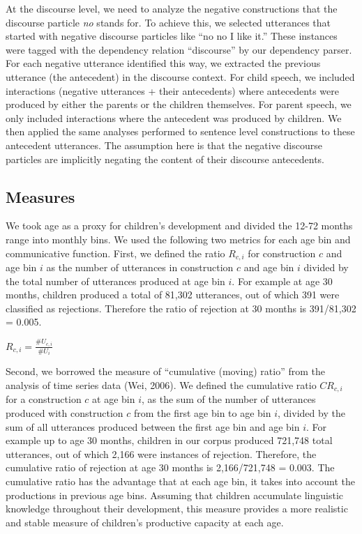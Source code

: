 \documentclass[
  english,
  man,floatsintext]{apa6}
\begin{document}
At the discourse level, we need to analyze the negative constructions that the discourse particle \emph{no} stands for. To achieve this, we selected utterances that started with negative discourse particles like ``no no I like it.'' These instances were tagged with the dependency relation ``discourse'' by our dependency parser. For each negative utterance identified this way, we extracted the previous utterance (the antecedent) in the discourse context. For child speech, we included interactions (negative utterances + their antecedents) where antecedents were produced by either the parents or the children themselves. For parent speech, we only included interactions where the antecedent was produced by children. We then applied the same analyses performed to sentence level constructions to these antecedent utterances. The assumption here is that the negative discourse particles are implicitly negating the content of their discourse antecedents.

\hypertarget{measures}{%
\subsection{Measures}\label{measures}}

We took age as a proxy for children's development and divided the 12-72 months range into monthly bins. We used the following two metrics for each age bin and communicative function. First, we defined the ratio \(R_{c,i}\) for construction \(c\) and age bin \(i\) as the number of utterances in construction \(c\) and age bin \(i\) divided by the total number of utterances produced at age bin \(i\). For example at age 30 months, children produced a total of 81,302 utterances, out of which 391 were classified as rejections. Therefore the ratio of rejection at 30 months is 391/81,302 = 0.005.

\(R_{c, i} = \frac{\#U_{c,i}}{\#U_{i}}\)

Second, we borrowed the measure of ``cumulative (moving) ratio'' from the analysis of time series data (Wei, 2006). We defined the cumulative ratio \(CR_{c,i}\) for a construction \(c\) at age bin \(i\), as the sum of the number of utterances produced with construction \(c\) from the first age bin to age bin \(i\), divided by the sum of all utterances produced between the first age bin and age bin \(i\). For example up to age 30 months, children in our corpus produced 721,748 total utterances, out of which 2,166 were instances of rejection. Therefore, the cumulative ratio of rejection at age 30 months is 2,166/721,748 = 0.003. The cumulative ratio has the advantage that at each age bin, it takes into account the productions in previous age bins. Assuming that children accumulate linguistic knowledge throughout their development, this measure provides a more realistic and stable measure of children's productive capacity at each age.
\end{document}
